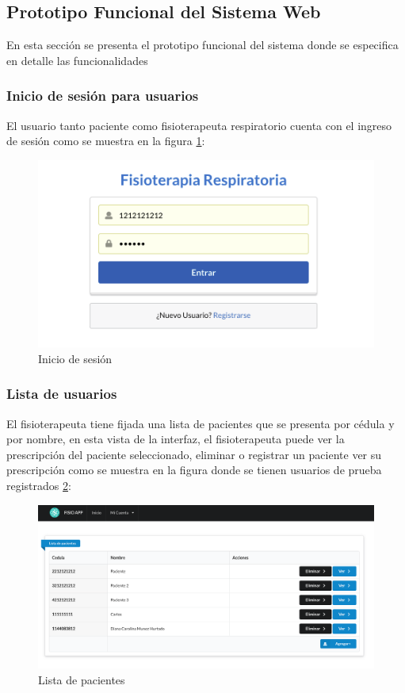 \documentclass[12pt]{article}
\begin{document}
\subsection{Prototipo Funcional del Sistema Web }

En esta sección se presenta el prototipo funcional del sistema donde se especifica en detalle las funcionalidades

\subsubsection{Inicio de sesión para usuarios}

El usuario tanto paciente como fisioterapeuta respiratorio cuenta con el ingreso de sesión como se muestra en la figura \ref{33}:

\begin{figure}[ht]
\centering
\includegraphics[scale=0.6]{imag/appiniciosesion.png}
\caption{Inicio de sesión}
\label{33}
\end{figure}
\FloatBarrier


\subsubsection{Lista de usuarios}

El fisioterapeuta tiene fijada una lista de pacientes que se presenta por cédula y por nombre, en esta vista de la interfaz, el fisioterapeuta puede ver la prescripción del paciente seleccionado, eliminar o registrar un paciente ver su prescripción como se muestra en la figura donde se tienen usuarios de prueba registrados \ref{34}:

\begin{figure}[ht]
\centering
\includegraphics[scale=0.3]{imag/listpacientes.png}
\caption{Lista de pacientes}
\label{34}
\end{figure}
\FloatBarrier
\end{document}
